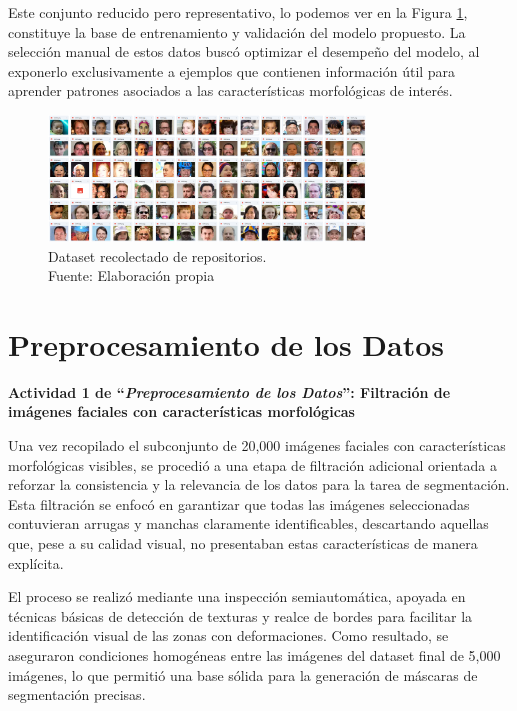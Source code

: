 Este conjunto reducido pero representativo, lo podemos ver en la Figura \ref{4:fig1}, constituye la base de entrenamiento y validación del modelo propuesto. La selección manual de estos datos buscó optimizar el desempeño del modelo, al exponerlo exclusivamente a ejemplos que contienen información útil para aprender patrones asociados a las características morfológicas de interés.

\begin{figure}[h]
	\begin{center}
		\includegraphics[width=0.75\textwidth]{4/figures/data.png}
		\caption[Dataset recolectado de repositorios]{Dataset recolectado de repositorios.\\
		Fuente: Elaboración propia}
		\label{4:fig1}
	\end{center}
\end{figure}

\section{Preprocesamiento de los Datos}

\textbf{Actividad 1 de “\textit{Preprocesamiento de los Datos}”: Filtración de imágenes faciales con características morfológicas}

Una vez recopilado el subconjunto de 20,000 imágenes faciales con características morfológicas visibles, se procedió a una etapa de filtración adicional orientada a reforzar la consistencia y la relevancia de los datos para la tarea de segmentación. Esta filtración se enfocó en garantizar que todas las imágenes seleccionadas contuvieran arrugas y manchas claramente identificables, descartando aquellas que, pese a su calidad visual, no presentaban estas características de manera explícita.

El proceso se realizó mediante una inspección semiautomática, apoyada en técnicas básicas de detección de texturas y realce de bordes para facilitar la identificación visual de las zonas con deformaciones. Como resultado, se aseguraron condiciones homogéneas entre las imágenes del dataset final de 5,000 imágenes, lo que permitió una base sólida para la generación de máscaras de segmentación precisas.

